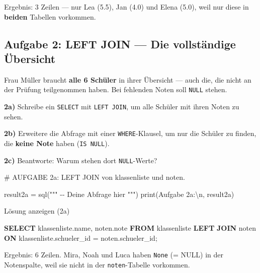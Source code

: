 \documentclass[
  nswissgerman,
  a4paper,
  DIV=11,
  numbers=noendperiod,
  ngerman]{scrreprt}
\newenvironment{Shaded}{\begin{snugshade}}{\end{snugshade}}
\newcommand{\BuiltInTok}[1]{\textcolor[rgb]{0.00,0.23,0.31}{#1}}
\newcommand{\CharTok}[1]{\textcolor[rgb]{0.13,0.47,0.30}{#1}}
\newcommand{\CommentTok}[1]{\textcolor[rgb]{0.37,0.37,0.37}{#1}}
\newcommand{\KeywordTok}[1]{\textcolor[rgb]{0.00,0.23,0.31}{\textbf{#1}}}
\newcommand{\NormalTok}[1]{\textcolor[rgb]{0.00,0.23,0.31}{#1}}
\newcommand{\OperatorTok}[1]{\textcolor[rgb]{0.37,0.37,0.37}{#1}}
\newcommand{\StringTok}[1]{\textcolor[rgb]{0.13,0.47,0.30}{#1}}
\begin{document}
Ergebnis: 3 Zeilen --- nur Lea (5.5), Jan (4.0) und Elena (5.0), weil
nur diese in \textbf{beiden} Tabellen vorkommen.

\subsection{Aufgabe 2: LEFT JOIN --- Die vollständige
Übersicht}\label{aufgabe-2-left-join-die-vollstuxe4ndige-uxfcbersicht}

Frau Müller braucht \textbf{alle 6 Schüler} in ihrer Übersicht --- auch
die, die nicht an der Prüfung teilgenommen haben. Bei fehlenden Noten
soll \texttt{NULL} stehen.

\textbf{2a)} Schreibe ein \texttt{SELECT} mit \texttt{LEFT\ JOIN}, um
alle Schüler mit ihren Noten zu sehen.

\textbf{2b)} Erweitere die Abfrage mit einer \texttt{WHERE}-Klausel, um
nur die Schüler zu finden, die \textbf{keine Note} haben
(\texttt{IS\ NULL}).

\textbf{2c)} Beantworte: Warum stehen dort \texttt{NULL}-Werte?

\begin{Shaded}
\begin{Highlighting}[numbers=left,,]
\CommentTok{\# AUFGABE 2a: LEFT JOIN von klassenliste und noten.}

\NormalTok{result2a }\OperatorTok{=}\NormalTok{ sql(}\StringTok{"""}
\StringTok{{-}{-} Deine Abfrage hier}
\StringTok{"""}\NormalTok{)}
\BuiltInTok{print}\NormalTok{(}\StringTok{\textquotesingle{}Aufgabe 2a:}\CharTok{\textbackslash{}n}\StringTok{\textquotesingle{}}\NormalTok{, result2a)}
\end{Highlighting}
\end{Shaded}

Lösung anzeigen (2a)

\begin{Shaded}
\begin{Highlighting}[numbers=left,,]
\KeywordTok{SELECT}\NormalTok{ klassenliste.name, noten.note}
\KeywordTok{FROM}\NormalTok{ klassenliste}
\KeywordTok{LEFT} \KeywordTok{JOIN}\NormalTok{ noten}
  \KeywordTok{ON}\NormalTok{ klassenliste.schueler\_id }\OperatorTok{=}\NormalTok{ noten.schueler\_id;}
\end{Highlighting}
\end{Shaded}

Ergebnis: 6 Zeilen. Mira, Noah und Luca haben \texttt{None} (= NULL) in
der Notenspalte, weil sie nicht in der \texttt{noten}-Tabelle vorkommen.
\end{document}
